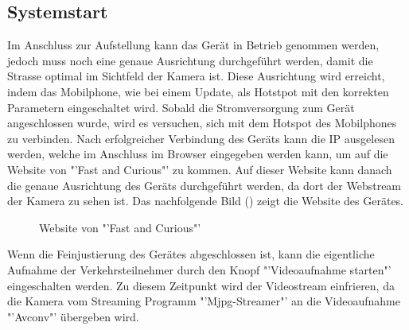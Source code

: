 \subsection{Systemstart}
Im Anschluss zur Aufstellung kann das Gerät in Betrieb genommen werden, jedoch muss noch eine genaue Ausrichtung durchgeführt werden, damit die Strasse optimal im Sichtfeld der Kamera ist. Diese Ausrichtung wird erreicht, indem das Mobilphone, wie bei einem Update, als Hotstpot mit den korrekten Parametern eingeschaltet wird. Sobald die Stromversorgung zum Gerät angeschlossen wurde, wird es versuchen, sich mit dem Hotspot des Mobilphones zu verbinden. Nach erfolgreicher Verbindung des Geräts kann die IP ausgelesen werden, welche im Anschluss im Browser eingegeben werden kann, um auf die Website von "'Fast and Curious"' zu kommen. Auf dieser Website kann danach die genaue Ausrichtung des Geräts durchgeführt werden, da dort der Webstream der Kamera zu sehen ist. Das nachfolgende Bild () zeigt die Website des Gerätes.

\begin{figure}[H]
  \centering
  \caption{Website von "'Fast and Curious"'}
  \label{bWebsite}
\end{figure} 

Wenn die Feinjustierung des Gerätes abgeschlossen ist, kann die eigentliche Aufnahme der Verkehrsteilnehmer durch den Knopf "'Videoaufnahme starten"' eingeschalten werden. Zu diesem Zeitpunkt wird der Videostream einfrieren, da die Kamera vom Streaming Programm "'Mjpg-Streamer"' an die Videoaufnahme "'Avconv"' übergeben wird.